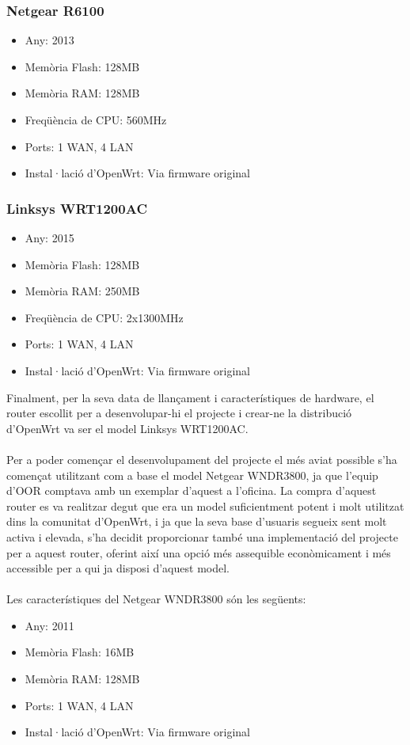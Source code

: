 \documentclass[11pt]{article}
\begin{document}
\subsubsection{Netgear R6100}
\begin{itemize}
\item Any: 2013
\item Memòria Flash: 128MB
\item Memòria RAM: 128MB
\item Freqüència de CPU: 560MHz
\item Ports: 1 WAN, 4 LAN
\item Instal·lació d’OpenWrt: Via firmware original
\end{itemize}

\subsubsection{Linksys WRT1200AC}
\begin{itemize}
\item Any: 2015
\item Memòria Flash: 128MB
\item Memòria RAM: 250MB
\item Freqüència de CPU: 2x1300MHz
\item Ports: 1 WAN, 4 LAN
\item Instal·lació d’OpenWrt: Via firmware original
\end{itemize}


Finalment, per la seva data de llançament i característiques de hardware, el router escollit per a desenvolupar-hi el projecte i crear-ne la distribució d’OpenWrt va ser el model Linksys WRT1200AC.\\
\\
Per a poder començar el desenvolupament del projecte el més aviat possible s’ha començat utilitzant com a base el model Netgear WNDR3800, ja que l’equip d’OOR comptava amb un exemplar d’aquest a l’oficina. La compra d’aquest router es va realitzar degut que era un model suficientment potent i molt utilitzat dins la comunitat d’OpenWrt, i ja que la seva base d’usuaris segueix sent molt activa i elevada, s’ha decidit proporcionar també una implementació del projecte per a aquest router, oferint així una opció més assequible econòmicament i més accessible per a qui ja disposi d’aquest model.\\
\\
Les característiques del Netgear WNDR3800 són les següents:
\begin{itemize}
\item Any: 2011
\item Memòria Flash: 16MB
\item Memòria RAM: 128MB
\item Ports: 1 WAN, 4 LAN
\item Instal·lació d’OpenWrt: Via firmware original
\end{itemize}
\end{document}
